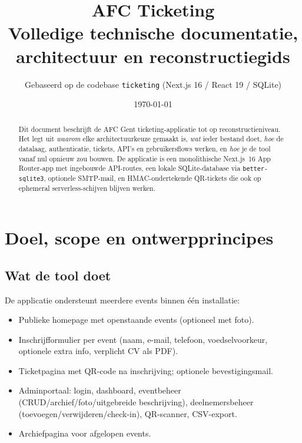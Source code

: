 \documentclass[11pt,a4paper]{report}
\title{\textbf{AFC Ticketing}\\[0.4em]
\large Volledige technische documentatie, architectuur en reconstructiegids}
\author{Gebaseerd op de codebase \texttt{ticketing} (Next.js 16 / React 19 / SQLite)}
\date{\today}
\begin{document}
\maketitle

\begin{abstract}
Dit document beschrijft de AFC Gent ticketing-applicatie tot op reconstructieniveau.
Het legt uit \emph{waarom} elke architectuurkeuze gemaakt is, \emph{wat} ieder bestand doet,
\emph{hoe} de datalaag, authenticatie, tickets, API's en gebruikersflows werken, en
\emph{hoe} je de tool vanaf nul opnieuw zou bouwen.
De applicatie is een monolithische Next.js~16 App Router-app met ingebouwde API-routes,
een lokale SQLite-database via \texttt{better-sqlite3}, optionele SMTP-mail, en HMAC-ondertekende
QR-tickets die ook op ephemeral serverless-schijven blijven werken.
\end{abstract}

\tableofcontents
\newpage

\chapter{Doel, scope en ontwerpprincipes}

\section{Wat de tool doet}
De applicatie ondersteunt meerdere events binnen één installatie:
\begin{itemize}[leftmargin=*]
  \item Publieke homepage met openstaande events (optioneel met foto).
  \item Inschrijfformulier per event (naam, e-mail, telefoon, voedselvoorkeur, optionele extra info, verplicht CV als PDF).
  \item Ticketpagina met QR-code na inschrijving; optionele bevestigingsmail.
  \item Adminportaal: login, dashboard, eventbeheer (CRUD/archief/foto/uitgebreide beschrijving),
        deelnemersbeheer (toevoegen/verwijderen/check-in), QR-scanner, CSV-export.
  \item Archiefpagina voor afgelopen events.
\end{itemize}
\end{document}
